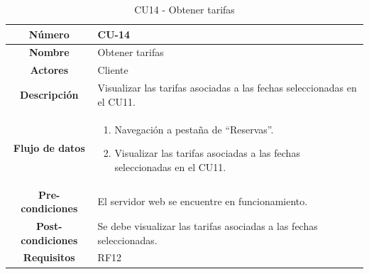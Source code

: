 \begin{table}[h!tb]
	\centering
	\begin{adjustbox}{width=1\textwidth}
	\begin{tabular}{|c|p{\textwidth}|}
		\hline {\bf Número} & CU-14 \\
		\hline {\bf Nombre} & Obtener tarifas\\
		\hline {\bf Actores} & Cliente \\
		\hline {\bf Descripción} & Visualizar las tarifas asociadas a las fechas seleccionadas en el CU11. \\
		\hline {\bf Flujo de datos}
		& 
		\begin{enumerate}
			\item Navegación a pestaña de ``Reservas''.
            \item Visualizar las tarifas asociadas a las fechas seleccionadas en el CU11. 
           
        \end{enumerate}\\
		\hline {\bf Pre-condiciones}
		& El servidor web se encuentre en funcionamiento. \\
        
		\hline {\bf Post-condiciones}
		& Se debe visualizar las tarifas asociadas a las fechas seleccionadas. \\
    
		\hline {\bf Requisitos} & RF12 \\
		\hline 
	\end{tabular}
	\end{adjustbox}
	\caption{CU14 - Obtener tarifas\label{tbl:CU14}}
\end{table}

